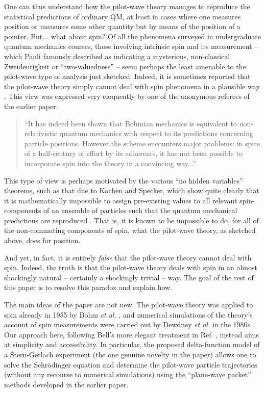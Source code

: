 \documentclass[aps,prc,onecolumn,letterpaper,floatfix,12pt]{revtex4}
\begin{document}
One can thus understand how the pilot-wave
theory manages to reproduce the statistical predictions of ordinary
QM, at least in cases where one measures position or measures some
other quantity but by means of the position of a pointer.  But... what
about spin?  Of all the phenomena surveyed in undergraduate quantum
mechanics courses, those involving intrinsic spin and its measurement
-- which Pauli famously described as indicating a mysterious,
non-classical Zweideutigkeit or ``two-valuedness'' \cite{pauli} -- 
seem perhaps the least amenable to the pilot-wave type of analysis
just sketched.  Indeed, it is sometimes reported that the pilot-wave
theory simply cannot deal with spin phenomena in a plausible way \cite{motl}.  
This view was expressed very eloquently by one of the anonymous
referees of the earlier paper:
\begin{quote}
``It has indeed been shown that Bohmian
mechanics is equivalent to non-relativistic quantum mechanics with
respect to its predictions concerning particle positions. However the
scheme encounters major problems: in spite of a half-century of effort
by its adherents, it has not been possible to incorporate spin into
the theory in a convincing way...''   
\end{quote}
This type of view is perhaps
motivated by the various ``no hidden variables'' theorems, such as
that due to Kochen and Specker, which show quite clearly that it is mathematically
impossible to assign pre-existing values to all relevant 
spin-components of an ensemble of particles such that the quantum
mechanical predictions are reproduced \cite{ks,mermin}.  
That is, it is known to be
impossible to do, for all of the non-commuting components of spin, 
what the pilot-wave theory, as sketched above, does for position.  

And yet, in fact, it is entirely \emph{false} that the pilot-wave
theory cannot deal with spin.  Indeed, the truth is that the
pilot-wave theory deals with spin in an almost shockingly natural --
certainly a shockingly trivial -- way.  The goal of the rest of this
paper is to resolve this paradox and explain how.

The main ideas of the paper are not new.  The pilot-wave theory was
applied to spin already in 1955 by Bohm \emph{et al.} \cite{bst}, and
numerical simulations of the theory's account of spin measurements
were carried out by Dewdney \emph{et al.} in the 1980s \cite{dhk}.  
Our approach here, following Bell's more elegant treatment in Ref. \cite{bellspin} ,
instead aims at simplicity and accessibility.  In particular, the
proposed delta-function model
of a Stern-Gerlach experiment (the one genuine novelty in the paper) 
allows one to solve the Schr\"odinger equation
and determine the pilot-wave particle trajectories (without any
recourse to numerical simulations) using the ``plane-wave packet'' 
methods developed in the earlier paper.
\end{document}
